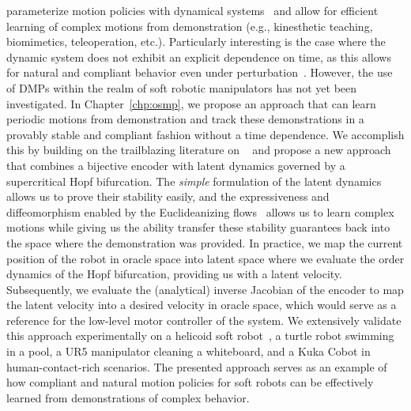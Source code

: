  parameterize motion policies with dynamical systems~\cite{ijspeert2013dynamical, saveriano2023dynamic} and allow for efficient learning of complex motions from demonstration (e.g., kinesthetic teaching, biomimetics, teleoperation, etc.).
Particularly interesting is the case where the dynamic system does not exhibit an explicit dependence on time, as this allows for natural and compliant behavior even under perturbation~\cite{ijspeert2013dynamical}.
However, the use of \glspl{DMP} within the realm of soft robotic manipulators has not yet been investigated.
In Chapter~\ref{chp:osmp}, we propose an approach that can learn periodic motions from demonstration and track these demonstrations in a provably stable and compliant fashion without a time dependence.
We accomplish this by building on the trailblazing literature on ~\cite{ijspeert2013dynamical, rana2020euclideanizing, perez2023stable} and propose a new approach that combines a bijective encoder with latent dynamics governed by a supercritical Hopf bifurcation. The \emph{simple} formulation of the latent dynamics allows us to prove their stability easily, and the expressiveness and diffeomorphism enabled by the Euclideanizing flows~\cite{dinh2016density, rana2020euclideanizing} allows us to learn complex motions while giving us the ability transfer these stability guarantees back into the space where the demonstration was provided.
In practice, we map the current position of the robot in oracle space into latent space where we evaluate the  order dynamics of the Hopf bifurcation, providing us with a latent velocity.
Subsequently, we evaluate the (analytical) inverse Jacobian of the encoder to map the latent velocity into a desired velocity in oracle space, which would serve as a reference for the low-level motor controller of the system.
We extensively validate this approach experimentally on a helicoid soft robot~\cite{guan2023trimmed}, a turtle robot swimming in a pool, a UR5 manipulator cleaning a whiteboard, and a Kuka \gls{Cobot} in human-contact-rich scenarios.
The presented approach serves as an example of how compliant and natural motion policies for soft robots can be effectively learned from demonstrations of complex behavior.
